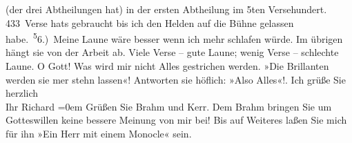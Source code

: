\begin{ledgroupsized}[t]{13cm}
               (der drei Abtheilungen hat) in der ersten Abtheilung im 5ten Versehundert. 433 Verse hats gebraucht bis
               ich den Helden auf die Bühne gelassen habe. \substVorne{}\textsuperscript{5}\substDazwischen{}6\substHinten{}.) Meine Laune wäre besser {\pb}wenn ich mehr schlafen würde. Im übrigen hängt sie von der Arbeit ab. Viele Verse –
               gute Laune; wenig Verse – schlechte Laune. O Gott! Was wird mir nicht Alles
               gestrichen werden. »Die Brillanten werden sie mer stehn lassen«! Antworten sie
               höflich: »Also Alles«!.\pend
           \pstart
            Ich grüße Sie herzlich{\\[\baselineskip]}Ihr \spacefill\mbox{Richard}\pend
           \leftskip=0em{}\pstart
           \noindent{}Grüßen Sie Brahm und Kerr. Dem Brahm bringen Sie um Gotteswillen keine
                  bessere Meinung von mir bei! Bis auf Weiteres laßen Sie mich für ihn »Ein Herr mit
                  einem Monocle« sein.\pend
           
         
         \endnumbering{}\end{ledgroupsized}  \newcommand{\dateiname}{L00988}\newcommand{\titel}{Richard Beer-Hofmann an Arthur Schnitzler, 3. 10. 1899}\newcommand{\editorInnen}{Martin Anton Müller und Gerd-Hermann Susen}
      